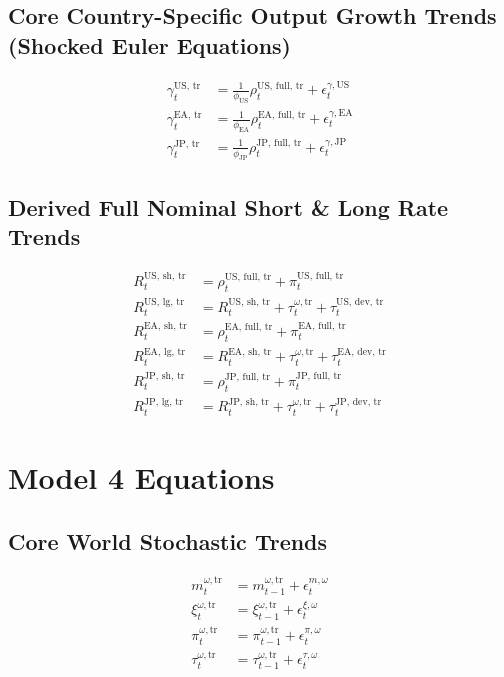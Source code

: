 \documentclass{article}
\begin{document}
\subsection*{Core Country-Specific Output Growth Trends (Shocked Euler Equations)}
\begin{align}
    \gamma^{\text{US, tr}}_t &= \frac{1}{\phi_{\text{US}}} \rho^{\text{US, full, tr}}_t + \epsilon^{\gamma, \text{US}}_t \\
    \gamma^{\text{EA, tr}}_t &= \frac{1}{\phi_{\text{EA}}} \rho^{\text{EA, full, tr}}_t + \epsilon^{\gamma, \text{EA}}_t \\
    \gamma^{\text{JP, tr}}_t &= \frac{1}{\phi_{\text{JP}}} \rho^{\text{JP, full, tr}}_t + \epsilon^{\gamma, \text{JP}}_t
\end{align}

\subsection*{Derived Full Nominal Short \& Long Rate Trends}

\begin{align}
    R^{\text{US, sh, tr}}_t &= \rho^{\text{US, full, tr}}_t + \pi^{\text{US, full, tr}}_t \\
    R^{\text{US, lg, tr}}_t  &= R^{\text{US, sh, tr}}_t + \tau^{\omega, \text{tr}}_t + \tau^{\text{US, dev, tr}}_t \\
    R^{\text{EA, sh, tr}}_t &= \rho^{\text{EA, full, tr}}_t + \pi^{\text{EA, full, tr}}_t \\
    R^{\text{EA, lg, tr}}_t  &= R^{\text{EA, sh, tr}}_t + \tau^{\omega, \text{tr}}_t + \tau^{\text{EA, dev, tr}}_t \\
    R^{\text{JP, sh, tr}}_t &= \rho^{\text{JP, full, tr}}_t + \pi^{\text{JP, full, tr}}_t \\
    R^{\text{JP, lg, tr}}_t  &= R^{\text{JP, sh, tr}}_t + \tau^{\omega, \text{tr}}_t + \tau^{\text{JP, dev, tr}}_t
\end{align}

\clearpage
\section*{Model 4 Equations} %

\subsection*{Core World Stochastic Trends}
\begin{align}
    m^{\omega, \text{tr}}_t &= m^{\omega, \text{tr}}_{t-1} + \epsilon^{m, \omega}_t \\
    \xi^{\omega, \text{tr}}_t &= \xi^{\omega, \text{tr}}_{t-1} + \epsilon^{\xi, \omega}_t \\
    \pi^{\omega, \text{tr}}_t &= \pi^{\omega, \text{tr}}_{t-1} + \epsilon^{\pi, \omega}_t \\
    \tau^{\omega, \text{tr}}_t &= \tau^{\omega, \text{tr}}_{t-1} + \epsilon^{\tau, \omega}_t
\end{align}
\end{document}

